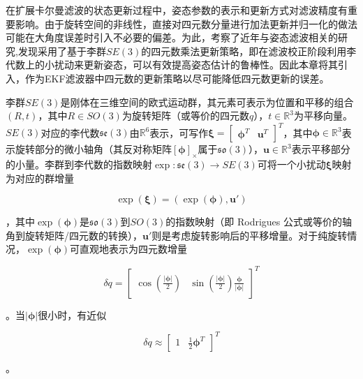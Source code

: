 在扩展卡尔曼滤波的状态更新过程中，姿态参数的表示和更新方式对滤波精度有重要影响。由于旋转空间的非线性，直接对四元数分量进行加法更新并归一化的做法可能在大角度误差时引入不必要的偏差。为此，考察了近年与姿态滤波相关的研究,发现采用了基于李群$SE(3)$的四元数乘法更新策略，即在滤波校正阶段利用李代数上的小扰动来更新姿态，可以有效提高姿态估计的鲁棒性\cite{9780112,Fang2024Kinematic}。因此本章将其引入，作为EKF滤波器中四元数的更新策略以尽可能降低四元数更新的误差。

李群$SE(3)$是刚体在三维空间的欧式运动群，其元素可表示为位置和平移的组合$(R, t)$，其中$R\in SO(3)$为旋转矩阵（或等价的四元数$q$），$t\in \mathbb{R}^3$为平移向量。$SE(3)$对应的李代数$\mathfrak{se}(3)$由$\mathbb{R}^6$表示，可写作$\boldsymbol{\xi} = \begin{bmatrix} \boldsymbol{\phi}^T & \mathbf{u}^T \end{bmatrix}^T$，其中$\boldsymbol{\phi}\in \mathbb{R}^3$表示旋转部分的微小轴角（其反对称矩阵$[\boldsymbol{\phi}]_\times$属于$\mathfrak{so}(3)$），$\mathbf{u}\in \mathbb{R}^3$表示平移部分的小量。李群到李代数的指数映射$\exp: \mathfrak{se}(3) \to SE(3)$可将一个小扰动$\boldsymbol{\xi}$映射为对应的群增量

\begin{equation}
	\exp(\boldsymbol{\xi}) = (\exp(\boldsymbol{\phi}), \mathbf{u}')
\end{equation}

，其中$\exp(\boldsymbol{\phi})$是$\mathfrak{so}(3)$到$SO(3)$的指数映射（即 Rodrigues 公式或等价的轴角到旋转矩阵/四元数的转换），$\mathbf{u}'$则是考虑旋转影响后的平移增量。对于纯旋转情况，$\exp(\boldsymbol{\phi})$可直观地表示为四元数增量

\begin{equation}
	\delta q = \begin{bmatrix} \cos(\frac{|\boldsymbol{\phi}|}{2}) & \sin(\frac{|\boldsymbol{\phi}|}{2})\frac{\boldsymbol{\phi}}{|\boldsymbol{\phi}|} \end{bmatrix}^T
\end{equation}

。当$|\boldsymbol{\phi}|$很小时，有近似

\begin{equation}
	\delta q \approx \begin{bmatrix} 1 & \frac{1}{2}\boldsymbol{\phi}^T \end{bmatrix}^T
\end{equation}

。

